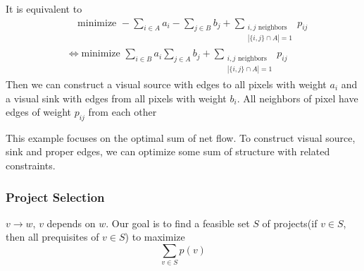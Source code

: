 It is equivalent to 
\begin{align*}
    &\,\quad\text{minimize }-\sum_{i\in A}a_i-\sum_{j\in B}b_j+\sum_{\substack{i,j\text{ neighbors}\\|\{i,j\}\cap A|=1}} p_{ij}\\
    &\Leftrightarrow \text{minimize }\sum_{i\in B}a_i\sum_{j\in A}b_j+\sum_{\substack{i,j\text{ neighbors}\\|\{i,j\}\cap A|=1}} p_{ij}
\end{align*}
Then we can construct a visual source with edges to all pixels with weight   $ a_i $ and a visual sink with edges from all pixels with weight   $ b_i $. All neighbors of pixel have edges of weight  $ p_{ij} $ from each other


\begin{remark}
    This example focuses on the optimal sum of net flow. To construct visual source, sink and proper edges, we can optimize some sum of structure with related constraints.
\end{remark}


\subsubsection{Project Selection}
\begin{example}
    $ v\to w $,  $ v $ depends on  $ w $. Our goal is to  find a feasible set  $ S $ of projects(if  $ v\in S $, then all prequisites of  $ v\in S $) to maximize 
    \[\sum_{v\in S}p(v)\]    
\end{example}
